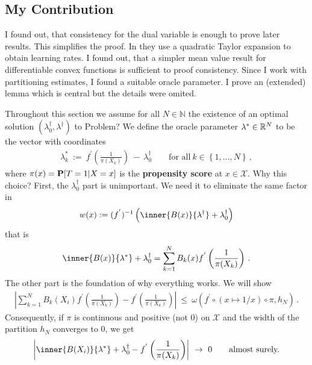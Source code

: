 \subsection*{My Contribution}
I found out, that consistency for the dual variable is enough to prove later results. This simplifies the proof. 
In \cite{Wang2019} they use a quadratic Taylor expansion to obtain learning rates. I found out, that a simpler mean value result for differentiable convex functions is sufficient to proof consistency. 
Since I work with partitioning estimates, I found a suitable oracle parameter.
I prove an (extended) lemma which is central but the details were omited.

Throughout this section we assume for all $N\in\mathbb{N}$ the existence of an 
optimal solution 
$(\lambda_0^\dagger,\lambda^\dagger)$
to Problem?
We define the oracle parameter $\lambda^*\in\R^N$ to be the vector with coordinates
\begin{gather}
  \label{oracle_1}
  \lambda^*_k
  \ 
  :=
  \ 
  f^{'}
  \left( 
    \frac{1}{\pi(X_k)}
  \right)
  \ 
  -
  \ 
  \lambda^\dagger_0
  \qquad
  \text{for all}\ 
  k\in \left\{ 1,\ldots,N \right\}
  \,,
\end{gather}
where $\pi(x)=\P[T=1|X=x]$ is the \textbf{propensity score} at $x\in\mathcal{X}$. Why this choice? First, the $\lambda_0^\dagger$ part is unimportant. We need it to eliminate the same factor in
\begin{gather}
  w(x):=
  (
  f^{'}
  )^{-1}
  \left( \inner{B(x)}{\lambda^\dagger}+\lambda_0^\dagger \right)
\end{gather}
that is 
\begin{gather}
  \inner{B(x)}{\lambda^*}+\lambda_0^\dagger 
  =
\sum_{k=1}^{N} 
B_k(x)
  f^{'}
  \left( 
    \frac{1}{\pi(X_k)}
  \right)
  \,.
\end{gather}
The other part is the foundation of why everything works.
We will show
\begin{gather}
\left| 
\sum_{k=1}^{N} 
B_k(X_i)
  f^{'}
  \left( 
    \frac{1}{\pi(X_k)}
  \right)
  -
  f^{'}
  \left( 
    \frac{1}{\pi(X_k)}
  \right)
\right|
\ 
\le
\ 
      \omega
      \left( f^{'}\circ (x\mapsto1/x)\circ \pi,h_N \right)
      \,.
\end{gather}
Consequently, if $\pi$ is continuous and positive (not 0) on $\mathcal{X}$ and the width of the partition $h_N$ converges to 0, we get 
\begin{gather}
 \left| 
  \inner{B(X_i)}{\lambda^*}+\lambda_0^\dagger 
  -
  f^{'}
  \left( 
    \frac{1}{\pi(X_k)}
  \right)
 \right| 
 \
 \to
 \ 
 0
 \qquad
 \text{almost surely.}
\end{gather}

